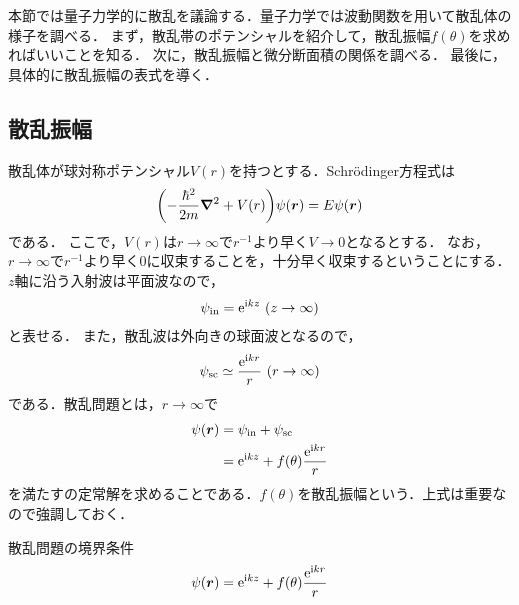\documentclass{report}
\begin{document}
  本節では量子力学的に散乱を議論する．量子力学では波動関数を用いて散乱体の様子を調べる．
  まず，散乱帯のポテンシャルを紹介して，散乱振幅$f(\theta)$を求めればいいことを知る．
  次に，散乱振幅と微分断面積の関係を調べる．
  最後に，具体的に散乱振幅の表式を導く．
  \subsection{散乱振幅}
    散乱体が球対称ポテンシャル$V(r)$を持つとする．Schrödinger方程式は
    \begin{align}
      \qty(-\frac{\hbar^2}{2m}\grad^2 + V(r))\psi(\bm{r}) = E \psi(\bm{r})\label{se-scattering}
    \end{align}
    である．
    ここで，$V(r)$は$r \to \infty$で$r^{-1}$より早く$V \to 0$となるとする．
    なお，$r \to \infty$で$r^{-1}$より早く$0$に収束することを，十分早く収束するということにする．
    $z$軸に沿う入射波は平面波なので，
    \begin{align}
      \psi_{\mathrm{in}} = \mathrm{e}^{\mathrm{i} k z}\ (z \to \infty)
    \end{align}
    と表せる．
    また，散乱波は外向きの球面波となるので，
    \begin{align}
      \psi_{\mathrm{sc}} \simeq \frac{\mathrm{e}^{\mathrm{i} kr}}{r}\ (r \to \infty)
    \end{align}
    である．散乱問題とは，$r \to \infty$で
    \begin{align}
      \psi(\bm{r}) &= \psi_{\mathrm{in}} + \psi_{\mathrm{sc}} \\ 
      &= \mathrm{e}^{\mathrm{i} kz} + f(\theta) \frac{\mathrm{e}^{\mathrm{i} kr}}{r}
    \end{align}
    を満たすの定常解を求めることである．$f(\theta)$を散乱振幅という．上式は重要なので強調しておく．
    \begin{itembox}[l]{散乱問題の境界条件}
      \begin{equation}
        \psi(\bm{r}) = \mathrm{e}^{\mathrm{i} kz} + f(\theta) \frac{\mathrm{e}^{\mathrm{i} kr}}{r}
      \end{equation}
    \end{itembox}
\end{document}
